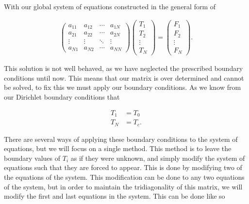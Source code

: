 \documentclass[10pt]{amsart}
\numberwithin{equation}{section}
\theoremstyle{definition}
\begin{document}
\begin{multicols}{2}
With our global system of equations constructed in the general form of

\begin{align}\label{eq:global_sys}
  \begin{pmatrix}
    a_{11} & a_{12} & \cdots & a_{1N}\\
    a_{21} & a_{22} & \cdots & a_{2N}\\
    \vdots & \vdots & \ddots & \vdots \\
    a_{N1} & a_{N2} & \cdots & a_{NN}
  \end{pmatrix}
  \begin{pmatrix}
    T_1 \\ T_2 \\ \vdots \\ T_N
  \end{pmatrix}
  =
  \begin{pmatrix}
    F_1 \\ F_2 \\ \vdots \\ F_N
  \end{pmatrix}.
\end{align}

This solution is not well behaved, as we have neglected the prescribed boundary
conditions until now. This means that our matrix is over determined and cannot
be solved, to fix this we must apply our boundary conditions. As we know from
our Dirichlet boundary conditions that

\begin{align*}
  T_1&=T_0\\
  T_N&=T_c.
\end{align*}

There are several ways of applying these boundary conditions to the system of
equations, but we will focus on a single method. This method is to leave the
boundary values of $T_i$ as if they were unknown, and simply modify the system
of equations such that they are forced to appear. This is done by modifying two
of the equations of the system. This modification can be done to any two
equations of the system, but in order to maintain the tridiagonality of this
matrix, we will modify the first and last equations in the system. This can be done like so


\end{multicols}
\end{document}

